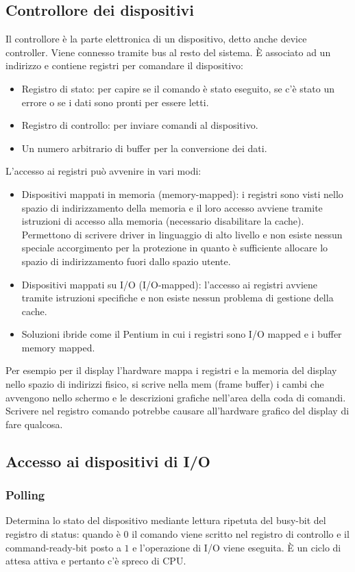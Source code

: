 \subsection{Controllore dei dispositivi}
Il controllore \`e la parte elettronica di un dispositivo, detto anche device controller. Viene connesso tramite bus al resto del sistema. \`E associato ad un indirizzo e contiene 
registri per comandare il dispositivo:
\begin{itemize}
	\item Registro di stato: per capire se il comando \`e stato eseguito, se c'\`e stato un errore o se i dati sono pronti per essere letti.
	\item Registro di controllo: per inviare comandi al dispositivo.
	\item Un numero arbitrario di buffer per la conversione dei dati. 
\end{itemize}
L'accesso ai registri pu\`o avvenire in vari modi:
\begin{itemize}
	\item Dispositivi mappati in memoria (memory-mapped): i registri sono visti nello spazio di indirizzamento della memoria e il loro accesso avviene tramite istruzioni di accesso
		alla memoria (necessario disabilitare la cache). Permettono di scrivere driver in linguaggio di alto livello e non esiste nessun speciale accorgimento per la protezione
		in quanto \`e sufficiente allocare lo spazio di indirizzamento fuori dallo spazio utente.
	\item Dispositivi mappati su I/O (I/O-mapped): l'accesso ai registri avviene tramite istruzioni specifiche e non esiste nessun problema di gestione della cache. 
	\item Soluzioni ibride come il Pentium in cui i registri sono I/O mapped e i buffer memory mapped. 
\end{itemize}
Per esempio per il display l'hardware mappa i registri e la memoria del display nello spazio di indirizzi fisico, si scrive nella mem (frame buffer) i cambi che avvengono nello schermo e
le descrizioni grafiche nell'area della coda di comandi. Scrivere nel registro comando potrebbe causare all'hardware grafico del display di fare qualcosa. 
\subsection{Accesso ai dispositivi di I/O}
\subsubsection{Polling}
Determina lo stato del dispositivo mediante lettura ripetuta del busy-bit del registro di status: quando \`e $0$ il comando viene scritto nel registro di controllo e il command-ready-bit
posto a $1$ e l'operazione di I/O viene eseguita. \`E un ciclo di attesa attiva e pertanto c'\`e spreco di CPU. 
